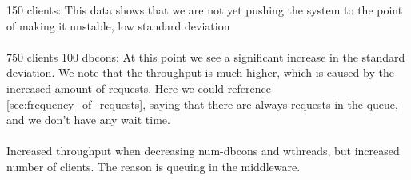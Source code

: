 \documentclass{article}
\begin{document}
            150 clients: This data shows that we are not yet pushing the system to the point of making it unstable, low standard deviation\\
            \\
            750 clients 100 dbcons: At this point we see a significant increase in the standard deviation. We note that the throughput is much higher, which is caused by the increased amount of requests. Here we could reference \ref{sec:frequency_of_requests}, saying that there are always requests in the queue, and we don't have any wait time.\\
            \\
            Increased throughput when decreasing num-dbcons and wthreads, but increased number of clients. The reason is queuing in the middleware.
\end{document}
